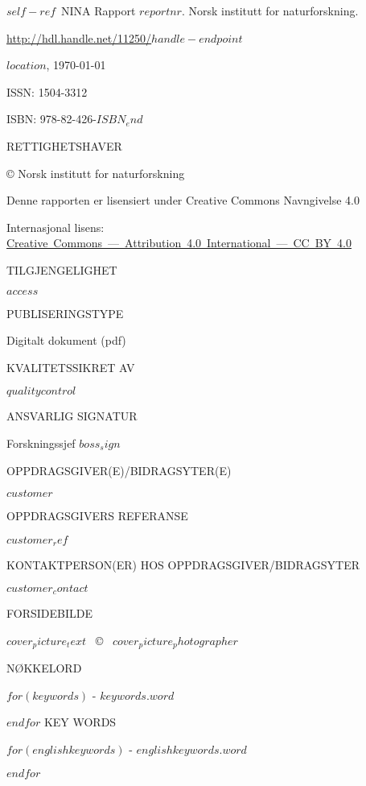 \documentclass[11pt, a4paper]{article}
\renewcommand*{\href}[2]{\hyperref[#1]{\color{darkblue}\setulcolor{darkblue}\ul{\mbox{#2}}}}
\newcommand{\smallspace}{\vspace{3mm}}
\begin{document}
\normalsize
{}
\small{$self-ref$}~NINA Rapport $reportnr$. Norsk institutt for naturforskning. \par \href{http://hdl.handle.net/11250/$handle-endpoint$}{http://hdl.handle.net/11250/$handle-endpoint$} \par \smallspace
$location$, \ninadate\today \par \smallspace
ISSN: 1504-3312 \par
ISBN: 978-82-426-$ISBN_end$ \par  \smallspace
{\scriptsize{RETTIGHETSHAVER}} \par
© Norsk institutt for naturforskning  \par
Denne rapporten er lisensiert under Creative Commons Navngivelse 4.0 \par
Internasjonal lisens: \href{https://creativecommons.org/licenses/by/4.0/}{Creative Commons — Attribution 4.0 International — CC BY 4.0}\par \smallspace
{\scriptsize{TILGJENGELIGHET}} \par
$access$ \par \smallspace
{\scriptsize{PUBLISERINGSTYPE}} \par
Digitalt dokument (pdf) \par \smallspace
{\scriptsize{KVALITETSSIKRET AV}} \par
$qualitycontrol$ \par \smallspace
{\scriptsize{ANSVARLIG SIGNATUR}} \par
Forskningssjef $boss_sign$ \par \smallspace
{\scriptsize{OPPDRAGSGIVER(E)/BIDRAGSYTER(E)}} \par
$customer$ \par \smallspace
{\scriptsize{OPPDRAGSGIVERS REFERANSE}} \par
$customer_ref$ \par \smallspace
{\scriptsize{KONTAKTPERSON(ER) HOS OPPDRAGSGIVER/BIDRAGSYTER}} \par
$customer_contact$ \par \smallspace
{\scriptsize{FORSIDEBILDE}} \par
$cover_picture_text$~ \copyright~ $cover_picture_photographer$ \par \smallspace
{\scriptsize{NØKKELORD}} \par\smallskip
$for(keywords)$
\small{\hyp{} $keywords.word$} \par
$endfor$
\vspace{5mm}
{\scriptsize{KEY WORDS}} \par\smallskip
$for(englishkeywords)$
\small{\hyp{} $englishkeywords.word$} \par
$endfor$
\end{document}
